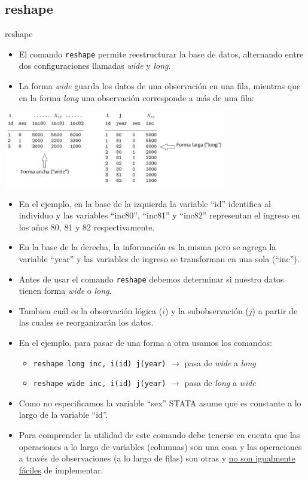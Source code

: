 \documentclass{beamer}
\begin{document}
\subsection{reshape}
\begin{frame}[allowframebreaks]{reshape}
\begin{itemize}
\item El comando \texttt{reshape} permite reestructurar la base de datos, alternando entre dos configuraciones llamadas \textit{wide} y \textit{long}.
\item La forma \textit{wide} guarda los datos de una observación en una fila, mientras que en la forma \textit{long} una observación corresponde a más de una fila: 
\end{itemize}
\centerline{\includegraphics[height=3.3cm]{graf3.jpg}}
\begin{itemize}
\item En el ejemplo, en la base de la izquierda la variable ``id'' identifica al individuo y las variables ``inc80'', ``inc81'' y ``inc82'' representan el ingreso en los años 80, 81 y 82 respectivamente.
\item En la base de la derecha, la información es la misma pero se agrega la variable ``year'' y las variables de ingreso se transforman en una sola (``inc'').
\item Antes de usar el comando \texttt{reshape} debemos determinar si nuestro datos tienen forma \textit{wide} o \textit{long}.
\item Tambien cuál es la observación lógica ($i$) y la subobservación ($j$) a partir de las cuales se reorganizarán los datos.
\item En el ejemplo, para pasar de una forma a otra usamos los comandos:
\begin{itemize}
\item {\footnotesize \texttt{reshape long inc, i(id) j(year)}} \hspace{0.05cm} $\rightarrow$ {\footnotesize pasa de \textit{wide} a \textit{long}}
\item {\footnotesize \texttt{reshape wide inc, i(id) j(year)}} \hspace{0.05cm} $\rightarrow$ {\footnotesize pasa de \textit{long} a \textit{wide}}
\end{itemize}
\item Como no especificamos la variable ``sex'' STATA asume que es constante a lo largo de la variable ``id''.
\item Para comprender la utilidad de este comando debe tenerse en cuenta que las operaciones a lo largo de variables (columnas) son una cosa y las operaciones a través de observaciones (a lo largo de filas) son otras y \underline{no son igualmente fáciles} de implementar.
\end{itemize}
\end{frame}
\end{document}
